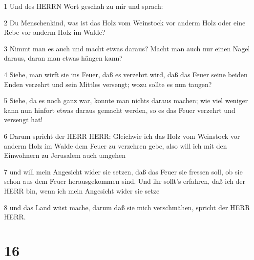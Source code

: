\par 1 Und des HERRN Wort geschah zu mir und sprach:
\par 2 Du Menschenkind, was ist das Holz vom Weinstock vor anderm Holz oder eine Rebe vor anderm Holz im Walde?
\par 3 Nimmt man es auch und macht etwas daraus? Macht man auch nur einen Nagel daraus, daran man etwas hängen kann?
\par 4 Siehe, man wirft sie ins Feuer, daß es verzehrt wird, daß das Feuer seine beiden Enden verzehrt und sein Mittles versengt; wozu sollte es nun taugen?
\par 5 Siehe, da es noch ganz war, konnte man nichts daraus machen; wie viel weniger kann nun hinfort etwas daraus gemacht werden, so es das Feuer verzehrt und versengt hat!
\par 6 Darum spricht der HERR HERR: Gleichwie ich das Holz vom Weinstock vor anderm Holz im Walde dem Feuer zu verzehren gebe, also will ich mit den Einwohnern zu Jerusalem auch umgehen
\par 7 und will mein Angesicht wider sie setzen, daß das Feuer sie fressen soll, ob sie schon aus dem Feuer herausgekommen sind. Und ihr sollt's erfahren, daß ich der HERR bin, wenn ich mein Angesicht wider sie setze
\par 8 und das Land wüst mache, darum daß sie mich verschmähen, spricht der HERR HERR.

\chapter{16}

